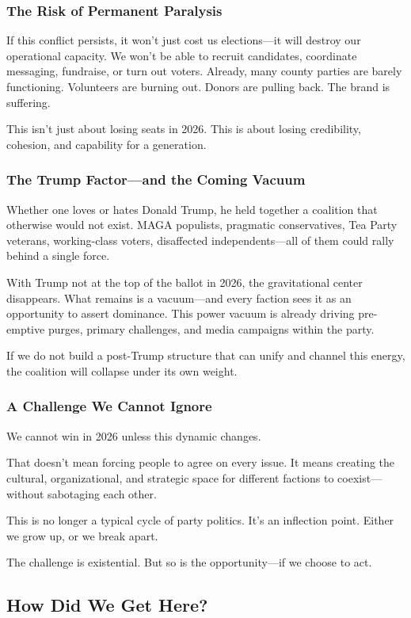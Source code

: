\subsubsection{The Risk of Permanent Paralysis}
If this conflict persists, it won’t just cost us elections—it will destroy our operational capacity. We won’t be able to recruit candidates, coordinate messaging, fundraise, or turn out voters. Already, many county parties are barely functioning. Volunteers are burning out. Donors are pulling back. The brand is suffering.

This isn’t just about losing seats in 2026. This is about losing credibility, cohesion, and capability for a generation.

\subsubsection{The Trump Factor—and the Coming Vacuum}
Whether one loves or hates Donald Trump, he held together a coalition that otherwise would not exist. MAGA populists, pragmatic conservatives, Tea Party veterans, working-class voters, disaffected independents—all of them could rally behind a single force.

With Trump not at the top of the ballot in 2026, the gravitational center disappears. What remains is a vacuum—and every faction sees it as an opportunity to assert dominance. This power vacuum is already driving pre-emptive purges, primary challenges, and media campaigns within the party.

If we do not build a post-Trump structure that can unify and channel this energy, the coalition will collapse under its own weight.

\subsubsection{A Challenge We Cannot Ignore}
We cannot win in 2026 unless this dynamic changes.

That doesn’t mean forcing people to agree on every issue. It means creating the cultural, organizational, and strategic space for different factions to coexist—without sabotaging each other.

This is no longer a typical cycle of party politics. It’s an inflection point. Either we grow up, or we break apart.

The challenge is existential. But so is the opportunity—if we choose to act.

\subsection{How Did We Get Here?}

